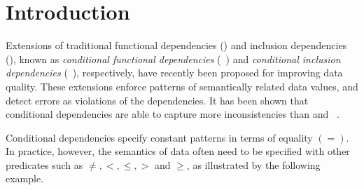 


\section{Introduction}
\label{sec-intro}



Extensions of traditional functional dependencies (\FDs) and inclusion dependencies
(\INDs), known as {\em conditional functional dependencies} (\CFDs~\cite{CFDs})
and {\em conditional inclusion dependencies} (\CINDs~\cite{tcs-CINDs}),
respectively, have recently been proposed for improving data quality.
These extensions enforce patterns of semantically
related data values, and
detect errors as violations of the dependencies.
It has been shown that conditional dependencies are able to capture more inconsistencies
than \FDs and \INDs~\cite{repair,tcs-CINDs,book-Fan}.

Conditional dependencies specify constant patterns in terms of
equality $(=)$. In practice, however, the semantics of data often
need to be specified %
with other predicates such as
$\ne, <, \le, >$ and $\ge$, as illustrated by the following example.




